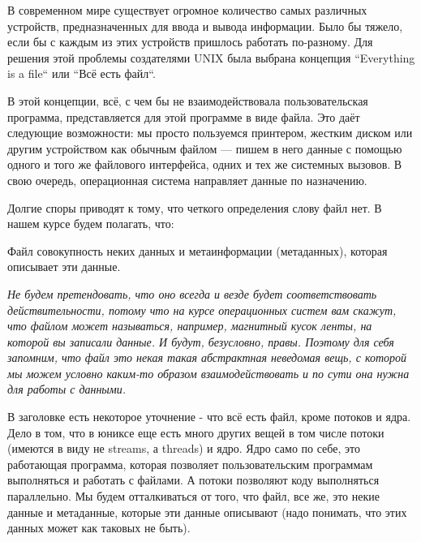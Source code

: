 В современном мире существует огромное количество самых различных устройств, предназначенных для ввода и вывода информации. Было бы тяжело, если бы с каждым из этих устройств пришлось работать по-разному. Для решения этой проблемы создателями UNIX была выбрана концепция “Everything is a file“ или “Всё есть файл“.

В этой концепции, всё, с чем бы не взаимодействовала пользовательская программа, представляется для этой программе в виде файла. Это даёт следующие возможности: мы просто пользуемся принтером, жестким диском или другим устройством как обычным файлом --- пишем в него данные с помощью одного и того же файлового интерфейса, одних и тех же системных вызовов. В свою очередь, операционная система направляет данные по назначению.

Долгие споры приводят к тому, что четкого определения слову файл нет. В нашем курсе будем полагать, что:

\begin{defi}{Файл}
	совокупность неких данных и метаинформации (метаданных), которая описывает эти данные.
\end{defi}

\textit{Не будем претендовать, что оно всегда и везде будет соответствовать действительности, потому что на курсе операционных систем вам скажут, что файлом может называться, например, магнитный кусок ленты, на которой вы записали данные. И будут, безусловно, правы. Поэтому для себя запомним, что файл это некая такая абстрактная неведомая вещь, с которой мы можем условно каким-то образом взаимодействовать и по сути она нужна для работы с данными.}

\begin{important}
	В заголовке есть некоторое уточнение - что всё есть файл, кроме потоков и ядра. Дело в том, что в юниксе еще есть много других вещей в том числе потоки (имеются в виду не streams, а threads) и ядро. Ядро само по себе, это работающая программа, которая позволяет пользовательским программам выполняться и работать с файлами. А потоки позволяют коду выполняться параллельно. Мы будем отталкиваться от того, что файл, все же, это некие данные и метаданные, которые эти данные описывают (надо понимать, что этих данных может как таковых не быть).
\end{important}
